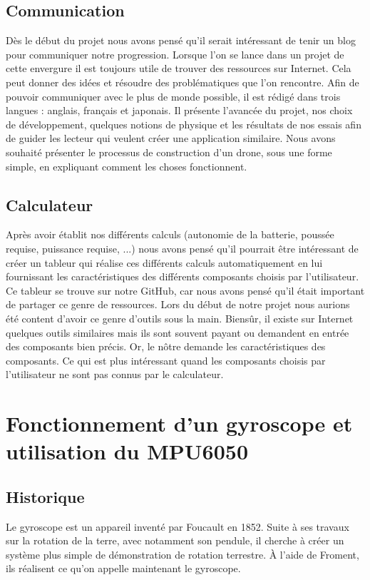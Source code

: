 \documentclass[a4paper,10pt]{report}
\begin{document}
      \section{Communication}
	Dès le début du projet nous avons pensé qu'il serait intéressant de 
tenir un blog pour communiquer notre progression. Lorsque l'on se lance dans un 
projet de cette envergure il est toujours utile de trouver des ressources sur 
Internet. Cela peut donner des idées et résoudre des problématiques que l'on 
rencontre. Afin de pouvoir communiquer avec le plus de monde possible, il est 
rédigé dans trois langues : anglais, français et japonais. Il présente 
l'avancée du projet, nos choix de développement, quelques notions de physique 
et les résultats de nos essais afin de guider les lecteur qui veulent créer une 
application similaire. Nous avons souhaité présenter le processus de 
construction d'un drone, sous une forme simple, en expliquant comment les 
choses fonctionnent.

      \section{Calculateur}
	Après avoir établit nos différents calculs (autonomie de la batterie, 
poussée requise, puissance requise, ...) nous avons pensé qu'il pourrait être 
intéressant de créer un tableur qui réalise ces différents calculs 
automatiquement en lui fournissant les caractéristiques des différents 
composants choisis par l'utilisateur. Ce tableur se trouve sur notre GitHub, 
car nous avons pensé qu'il était important de partager ce genre de ressources. 
Lors du début de notre projet nous aurions été content d'avoir ce genre 
d'outils sous la main. Biensûr, il existe sur Internet quelques outils 
similaires\cite{dronecalc} mais ils sont souvent payant ou demandent en entrée 
des composants bien précis. Or, le nôtre demande les caractéristiques des 
composants. Ce qui est plus intéressant quand les composants choisis par 
l'utilisateur ne sont pas connus par le calculateur.
	
    \chapter{Fonctionnement d'un gyroscope et utilisation du MPU6050}
      \section{Historique}
	Le gyroscope est un appareil inventé par Foucault en 1852. Suite à ses 
travaux sur la rotation de la terre, avec notamment son pendule, il cherche à 
créer un système plus simple de démonstration de rotation terrestre. À l'aide 
de Froment, ils réalisent ce qu'on appelle maintenant le gyroscope.
\end{document}
